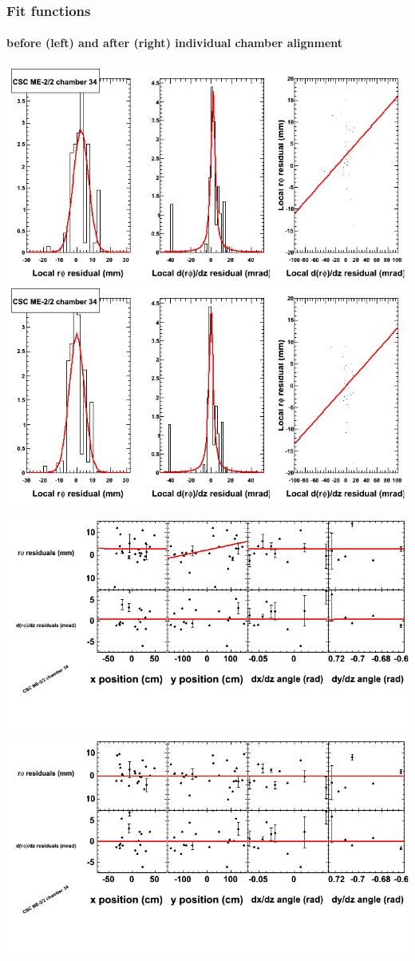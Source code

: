\documentclass[compress]{beamer}
\begin{document}
\begin{frame}
\frametitle{Fit functions}
\framesubtitle{before (left) and after (right) individual chamber alignment}
\includegraphics[width=0.5\linewidth]{ringfits_3dof/beforefit_MEm22_34_bellcurve.png} \includegraphics[width=0.5\linewidth]{ringfits_3dof/afterfit_MEm22_34_bellcurve.png}

\includegraphics[width=0.5\linewidth]{ringfits_3dof/beforefit_MEm22_34_polynomials.png} \includegraphics[width=0.5\linewidth]{ringfits_3dof/afterfit_MEm22_34_polynomials.png}
\end{frame}
\end{document}
